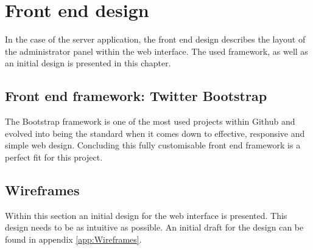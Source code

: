 \chapter{Front end design}
In the case of the server application, the front end design describes the layout of the administrator panel within the web interface. The used framework, as well as an initial design is presented in this chapter.

\section{Front end framework: Twitter Bootstrap}
The Bootstrap framework is one of the most used projects within Github and evolved into being the standard when it comes down to effective, responsive and simple web design. Concluding this fully customisable front end framework is a perfect fit for this project.

\section{Wireframes}
Within this section an initial design for the web interface is presented. This design needs to be as intuitive as possible. An initial draft for the design can be found in appendix \vref{app:Wireframes}.
